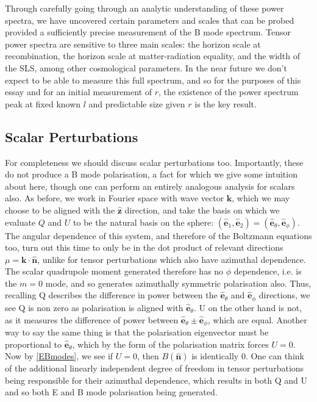 \documentclass[a4paper,10pt]{article}
\renewcommand{\v}[1]{\mathbf{#1}}
\newcommand{\unit}[1]{\hat{\v{#1}}}
\begin{document}
Through carefully going through an analytic understanding of these power spectra, we have uncovered certain parameters and scales that can be probed provided a sufficiently precise measurement of the B mode spectrum. Tensor power spectra are sensitive to three main scales: the horizon scale at recombination, the horizon scale at matter-radiation equality, and the width of the SLS, among other cosmological parameters. In the near future we don't expect to be able to measure this full spectrum, and so for the purposes of this essay and for an initial measurement of $r$, the existence of the power spectrum peak at fixed known $l$ and predictable size given $r$ is the key result.



\subsection{Scalar Perturbations}

For completeness we should discuss scalar perturbations too. Importantly, these do not produce a B mode polarisation, a fact for which we give some intuition about here, though one can perform an entirely analogous analysis for scalars also. As before, we work in Fourier space with wave vector $\v{k}$, which we may choose to be aligned with the $\unit{z}$ direction, and take the basis on which we evaluate $Q$ and $U$ to be the natural basis on the sphere: $(\unit{e}_1, \unit{e}_2) = (\unit{e}_\theta, \unit{e}_\phi)$. The angular dependence of this system, and therefore of the Boltzmann equations too, turn out this time to only be in the dot product of relevant directions $\mu=\v{k}\cdot\unit{n}$, unlike for tensor perturbations which also have azimuthal dependence. The scalar quadrupole moment generated therefore has no $\phi$ dependence, i.e. is the $m=0$ mode, and so generates azimuthally symmetric polarisation also. Thus, recalling Q describes the difference in power between the $\unit{e}_\theta$ and $\unit{e}_\phi$ directions, we see Q is non zero as polarisation is aligned with $\unit{e}_\theta$. U on the other hand is not, as it measures the difference of power between $\unit{e}_\theta\pm\unit{e}_\phi$, which are equal. Another way to say the same thing is that the polarisation eigenvector must be proportional to $\unit{e}_\theta$, which by the form of the polarisation matrix forces $U=0$. Now by \ref{EBmodes}, we see if $U=0$, then $B(\unit{n})$ is identically 0. One can think of the additional linearly independent degree of freedom in tensor perturbations being responsible for their azimuthal dependence, which results in both Q and U and so both E and B mode polarisation being generated. 
\end{document}
